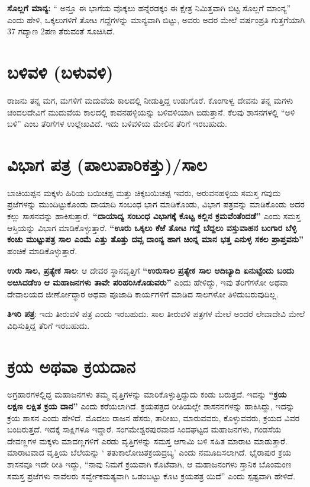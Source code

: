 \textbf{ಸೊಲ್ಲಗೆ ಮಾನ್ಯ:} “ ಅನ್ತೂ ಈ ಭಾಗೆಯ ವೊಕ್ಕಲು ಹನ್ನೆರಡಕ್ಕಂ ಈ ಕ್ಷೇತ್ರ ನಿಮಿತ್ತವಾಗಿ ಬಿಟ್ಟ ಸೊಲ್ಲಗೆ ಮಾಂನ್ಯ”\textbf{ }ಎಂದು ಹೇಳಿ, ಒಕ್ಕಲುಗಳಿಗೆ ತೋಟ ಗದ್ದೆಗಳನ್ನು ಮಾನ್ಯವಾಗಿ ಬಿಟ್ಟು, ಅವರು ಅದರ ಮೇಲೆ ವರ್ಷಂಪ್ರತಿ ಗುತ್ತಗೆಯಾಗಿ 37 ಗದ್ಯಾಣ 2ಪಣ ತೆರುವಂತೆ ಸೂಚಿಸಿದೆ.


\section{ಬಳಿವಳಿ (ಬಳುವಳಿ)}

ರಾಜನು ತನ್ನ ಮಗ, ಮಗಳಿಗೆ ಮದುವೆಯ ಕಾಲದಲ್ಲಿ ನೀಡುತ್ತಿದ್ದ ಉಡುಗೊರೆ. ಕೊಂಗಾಳ್ವ ದೇವನು ತನ್ನ ಮಗಳು ಚಂದಲದೇವಿಗೆ ಮುದುವೆಯ ಕಾಲದಲ್ಲಿ ಕಾವನಹಳ್ಳಿಯನ್ನು ಬಳಿವಳಿಯಾಗಿ ಬಿಡುತ್ತಾನೆ. ಕೆಲವು ಶಾಸನಗಳಲ್ಲಿ “ಅಳಿ ಬಳಿ” ಎಂಬ ತೆರಿಗೆಗಳ ಉಲ್ಲೇಖವಿದೆ. ಇದು ಬಳಿವಳಿಯ ಮೇಲಿನ ತೆರಿಗೆ ಇರಬಹುದು.


\section{ವಿಭಾಗ ಪತ್ರ (ಪಾಲುಪಾರಿಕತ್ತು)/ಸಾಲ}

ಬಾಚಿಯಪ್ಪನ ಮಕ್ಕಳು ಹಿರಿಯ ಬಯಿಚಪ್ಪ ಮತ್ತು ಚಿಕ್ಕಬಯಿಚಪ್ಪ ಇವರು, ಅರುವನಹಳ್ಳಿಯ ಸಮಸ್ತ ಗವುದು ಪ್ರಜೆಗಳನ್ನು ಮುಂದಿಟ್ಟುಕೊಂಡು ದಾಯಾದಿ ಸಂಬಂಧ ಭಾಗ ಮಾಡಿಕೊಂಡು, ವಿಭಾಗ ಪತ್ರವನ್ನು ಮಾಡಿಕೊಂಡು ಅದರ ಕಲ್ಲು ಸಾಸನವನ್ನು ಹಾಕಿಸುತ್ತಾರೆ. \textbf{“ದಾಯಾದ್ಯ ಸಂಬಂಧ ವಿಭಾಗಕ್ಕೆ ಕೊಟ್ಟ ಕಲ್ಲಿನ ಕ್ರಮವೆಂತೆಂದಡೆ”} ಎಂದು ಸಮಸ್ತ ಆಸ್ತಿಯನ್ನು ವಿಭಾಗ ಮಾಡಿಕೊಳ್ಳುತ್ತಾರೆ. \textbf{“ಊರು ಒಕ್ಕಲು ಕೆಱೆ ತೋಟ ಗದ್ದೆ ಬೆದ್ದಲು ವಸ್ತುವಾಹನ ಬಂಗಾರ ಬೆಳ್ಳಿ ಕಂಚು ಮುಟ್ಟುಪತ್ರ ಸಾಲ ಎಂಮೆ ಎತ್ತು ತೊತ್ತು ದವ್ಸ ದಾಂನ್ಯ ಹಾಗ ಚಿಂನ್ನ ಮಾನ ಭತ್ತ ಎನುಳ್ಳ ಸಕಲ ಪ್ರಾಪ್ತವನು”} ಹಂಚಿಕೆ ಮಾಡಿಕೊಳ್ಳುತ್ತಾರೆ.

\textbf{ಉರು ಸಾಲ, ಪ್ರತ್ಯೇಕ ಸಾಲ}: ಆ ದೇವರ ಸ್ಥಾನವೃತ್ತಿಗೆ \textbf{“ಉರುಸಾಲ ಪ್ರತ್ಯೇಕ ಸಾಲ ಆದಿಬ್ಯಾದಿ ಏನುಟ್ಟೆಂದು ಬಂದು ಅಱಸಿದಡೆಉ ಆ ಮಹಾಜನಗಳು ತಾವೇ ಪರಿಹರಿಸಿಕೊಡುವರು” }ಎಂದು ಹೇಳಿದ್ದು, ಇವು ತೆರಿಗೆಗಳೋ ಅಥವಾ ದೇವಾಲಯದ ಜೀರ್ಣೋದ್ಧಾರ ಅಥವಾ ಪೂಜಾದಿ ಕಾರ್ಯಗಳಿಗೆ ಮಾಡಿದ ಸಾಲಗಳೋ ತಿಳಿದುಬರುವುದಿಲ್ಲ.

\textbf{ತಿಇರಿ ಪತ್ರ}: ಇದು ತೀರುವಳಿ ಪತ್ರ ಎಂದು ಇರಬಹುದು. ಸಾಲ ತೀರುವಳಿ ಪತ್ರಗಳ ಮೇಲೆ ಅಂದರೆ ಲೇವಾದೇವಿ ಮೇಲೆ ವಿಧಿಸುತ್ತಿದ್ದ ತೆರಿಗೆ ಇರಬಹುದು.


\section{ಕ್ರಯ ಅಥವಾ ಕ್ರಯದಾನ}

ಅಗ್ರಹಾರಗಳಲ್ಲಿದ್ದ ಮಹಾಜನಗಳು ತಮ್ಮ ವೃತ್ತಿಗಳನ್ನು ಮಾರಿಕೊಳ್ಳುತ್ತಿದ್ದುದು ಕಂಡು ಬರುತ್ತದೆ. ಇದನ್ನು\textbf{ “ಕ್ರಯ ಲಕ್ಷಣ ಲಕ್ಷಿತ ಕ್ರಯ ದಾನ” }ಎಂದು ಕರೆಯಲಾಗಿದೆ. ಕ್ರಯಪತ್ರದ ರೀತಿಯಲ್ಲೇ ಶಾಸನನಗಳನ್ನು ಹಾಕಿಸಿದ್ದು, ಇದನ್ನು ಕ್ರಯ ಶಾಸನ ಎಂದು ಹೇಳಿದೆ. ಮೊದಲು ರಾಜನ ಹೆಸರು, ತಾರೀಖು, ಮಾರುವವರು, ಕೊಳ್ಳುವವರು, ಕ್ರಯದ ವಿವರ ಬಂದಿರುತ್ತದೆ. ಇದಕ್ಕೆ ಸಾಕ್ಷಿಗಳೂ ಇದ್ದಾರೆ. ಸಂಗಮೇಶ್ವರಪುರವಾದ ಸಿಂದಘಟ್ಟದ ಮಹಾಜನಗಳು, ಗಂಡಸೆಯ ದೇವಣ್ಣಗಳ ಮಕ್ಕಳು ಮಾದಣ್ಣಗಳಿಗೆ ಎರಡು ವೃತ್ತಿಗಳನ್ನು ಸಮಸ್ತ ಆಗಾಮಿ ಬಳಿ ಸಹಿತ ಮಾರಾಟ ಮಾಡುತ್ತಾರೆ. ಮಾರಾಟವಾದ ವೃತ್ತಿಯ ಬೆಲೆಯನ್ನು ‘ ತತುಕಾಲೋಚಿತಕ್ರಯದ್ರಬ್ಯ’ ಎಂದು ನಮೂದಿಸಲಾಗಿದೆ. ಭೈರಾಪುರ ಕ್ರಯ ಶಾಸನವೂ ಇದೇ ರೀತಿ ಇದ್ದು, “ನಾವು ನಿಮಗೆ ಕ್ರಯವಾಗಿ ಕೊಟೆವಾಗಿ, ಆ ಮಹಾಜನಂಗಳು ಸ್ತಾನಿಕ ಬೊಂಮಂಣ ಸಮಸ್ತ ಪ್ರಜೆಗಳು ನಾವೆಲರು ಸರ್ವ್ವೇಕಮತ್ಯವಾಗಿ ಒಡಂಬಟ್ಟು ಕೊಟ ಕ್ರಯಪತ್ರ ಯಿದೆ” ಎಂದು ಸ್ಪಷ್ಟವಾಗಿ ಹೇಳಿದೆ.

